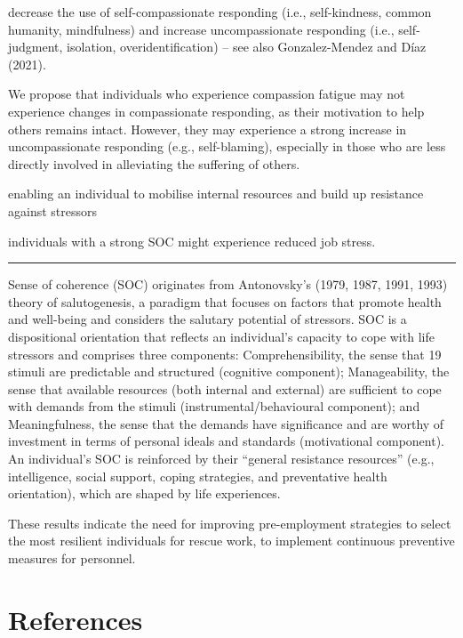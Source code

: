 \documentclass[
  man]{apa6}
\begin{document}
decrease the use of self-compassionate responding (i.e., self-kindness, common humanity, mindfulness) and increase uncompassionate responding (i.e., self-judgment, isolation, overidentification) -- see also Gonzalez-Mendez and Díaz (2021).

We propose that individuals who experience compassion fatigue may not experience changes in compassionate responding, as their motivation to help others remains intact. However, they may experience a strong increase in uncompassionate responding (e.g., self-blaming), especially in those who are less directly involved in alleviating the suffering of others.

enabling an individual to mobilise internal resources and build up resistance against stressors

individuals with a strong SOC might experience reduced job stress.

\begin{center}\rule{0.5\linewidth}{0.5pt}\end{center}

Sense of coherence (SOC) originates from Antonovsky's (1979,
1987, 1991, 1993) theory of salutogenesis, a paradigm that focuses
on factors that promote health and well-being and considers the
salutary potential of stressors. SOC is a dispositional orientation that
reflects an individual's capacity to cope with life stressors and
comprises three components: Comprehensibility, the sense that
19
stimuli are predictable and structured (cognitive component);
Manageability, the sense that available resources (both internal and
external) are sufficient to cope with demands from the stimuli
(instrumental/behavioural component); and Meaningfulness, the
sense that the demands have significance and are worthy of
investment in terms of personal ideals and standards (motivational
component). An individual's SOC is reinforced by their ``general
resistance resources'' (e.g., intelligence, social support, coping
strategies, and preventative health orientation), which are shaped by
life experiences.

These results indicate the need for improving pre-employment strategies to select the most resilient individuals for rescue work, to implement continuous preventive measures for personnel.

\newpage

\hypertarget{references}{%
\section{References}\label{references}}
\end{document}
